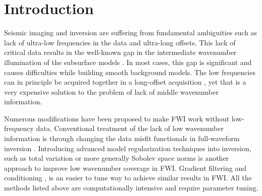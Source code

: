 \documentclass[manuscript]{geophysics}
\begin{document}
\section{Introduction}
Seismic imaging and inversion are suffering from fundamental ambiguities such as lack of ultra-low frequencies in the data and ultra-long offsets. This lack of critical data results in the well-known gap in the intermediate wavenumber illumination of the subsurface models \citep{claerbout1985, mora1989, sirgue2004, alkhalifahFullmodelWavenumberInversion2016, kazei2016, kazei2018, yao2019extraction}. In most cases, this gap is significant and causes difficulties while building smooth background models. The low frequencies can in principle be acquired together in a long-offset acquisition \citep[e.g.][]{fons2013}, yet that is a very expensive solution to the problem of lack of middle wavenumber information.


Numerous modifications have been proposed to make FWI work without low-frequency data. %
Conventional treatment of the lack of low wavenumber information is through changing the data misfit functionals in full-waveform inversion \citep[e.g.][]{luo1991wave, bozdag2011, choi2012, leeuwen2013, sun2019robust}.
Introducing advanced model regularization techniques into inversion, such as total variation or more generally Sobolev space norms \citep[e.g.][]{esserTotalvariationRegularizationStrategies2016, kazeiSaltbodyInversionMinimum2017, kalita2019regularized, skopintseva2019regularization} is another approach to improve low wavenumber coverage in FWI.
Gradient filtering and conditioning \citep{ravaut2004multiscale, alkhalifah2015full, kazei2016, ovcharenko2018, ruan2018global}, is an easier to tune way to achieve similar results in FWI. All the methods listed above are computationally intensive and require parameter tuning.
\end{document}

